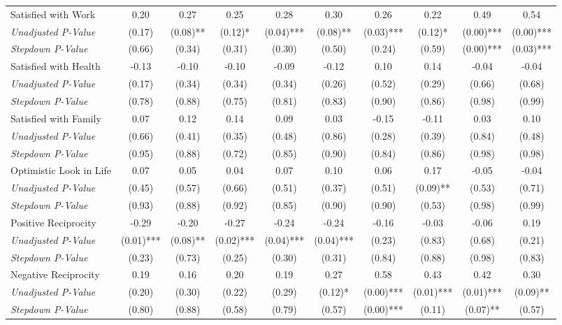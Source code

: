 \begin{tabular}{l c c c c c c c c c}
Satisfied with Work & 0.20 & 0.27 & 0.25 & 0.28 & 0.30 & 0.26 & 0.22 & 0.49 & 0.54 \\
\quad \textit{Unadjusted P-Value} & (0.17) & (0.08)** & (0.12)* & (0.04)*** & (0.08)** & (0.03)*** & (0.12)* & (0.00)*** & (0.00)*** \\
\quad \textit{Stepdown P-Value} & (0.66) & (0.34) & (0.31) & (0.30) & (0.50) & (0.24) & (0.59) & (0.00)*** & (0.03)*** \\
Satisfied with Health & -0.13 & -0.10 & -0.10 & -0.09 & -0.12 & 0.10 & 0.14 & -0.04 & -0.04 \\
\quad \textit{Unadjusted P-Value} & (0.17) & (0.34) & (0.34) & (0.34) & (0.26) & (0.52) & (0.29) & (0.66) & (0.68) \\
\quad \textit{Stepdown P-Value} & (0.78) & (0.88) & (0.75) & (0.81) & (0.83) & (0.90) & (0.86) & (0.98) & (0.99) \\
Satisfied with Family & 0.07 & 0.12 & 0.14 & 0.09 & 0.03 & -0.15 & -0.11 & 0.03 & 0.10 \\
\quad \textit{Unadjusted P-Value} & (0.66) & (0.41) & (0.35) & (0.48) & (0.86) & (0.28) & (0.39) & (0.84) & (0.48) \\
\quad \textit{Stepdown P-Value} & (0.95) & (0.88) & (0.72) & (0.85) & (0.90) & (0.84) & (0.86) & (0.98) & (0.98) \\
Optimistic Look in Life & 0.07 & 0.05 & 0.04 & 0.07 & 0.10 & 0.06 & 0.17 & -0.05 & -0.04 \\
\quad \textit{Unadjusted P-Value} & (0.45) & (0.57) & (0.66) & (0.51) & (0.37) & (0.51) & (0.09)** & (0.53) & (0.71) \\
\quad \textit{Stepdown P-Value} & (0.93) & (0.88) & (0.92) & (0.85) & (0.90) & (0.90) & (0.53) & (0.98) & (0.99) \\
Positive Reciprocity & -0.29 & -0.20 & -0.27 & -0.24 & -0.24 & -0.16 & -0.03 & -0.06 & 0.19 \\
\quad \textit{Unadjusted P-Value} & (0.01)*** & (0.08)** & (0.02)*** & (0.04)*** & (0.04)*** & (0.23) & (0.83) & (0.68) & (0.21) \\
\quad \textit{Stepdown P-Value} & (0.23) & (0.73) & (0.25) & (0.30) & (0.31) & (0.84) & (0.88) & (0.98) & (0.83) \\
Negative Reciprocity & 0.19 & 0.16 & 0.20 & 0.19 & 0.27 & 0.58 & 0.43 & 0.42 & 0.30 \\
\quad \textit{Unadjusted P-Value} & (0.20) & (0.30) & (0.22) & (0.29) & (0.12)* & (0.00)*** & (0.01)*** & (0.01)*** & (0.09)** \\
\quad \textit{Stepdown P-Value} & (0.80) & (0.88) & (0.58) & (0.79) & (0.57) & (0.00)*** & (0.11) & (0.07)** & (0.57) \\
\bottomrule
\end{tabular}
